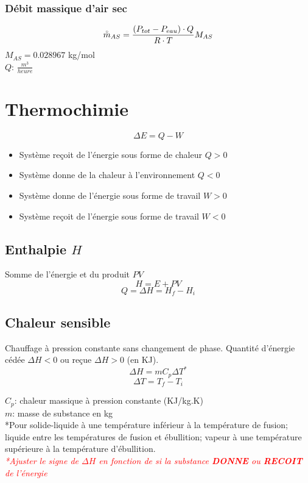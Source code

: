 \documentclass[twocolumn,letterpaper,8pt]{extarticle}
\newcommand{\warning}[1]{\textcolor{red}{\scriptsize\textit{#1}}}
\begin{document}
\subsubsection{Débit massique d'air sec}
$$\accentset{\circ}{m}_{AS}=\frac{(P_{tot}-P_{eau})\cdot Q}{R \cdot T}M_{AS}$$
{\footnotesize
$M_{AS}=0.028967$ kg/mol\\
$Q$: $\frac{m^3}{heure}$
}


\section{Thermochimie}
$$\Delta E = Q-W$$

\begin{itemize}
    \item Système reçoit de l'énergie sous forme de chaleur $Q>0$
    \item Système donne de la chaleur à l'environnement $Q<0$
    \item Système donne de l'énergie sous forme de travail $W>0$
    \item Système reçoit de l'énergie sous forme de travail $W<0$
\end{itemize}

\subsection{Enthalpie $H$}
Somme de l'énergie et du produit $PV$
$$H=E+PV$$
$$Q=\Delta H=H_f - H_i$$

\subsection{Chaleur sensible}
Chauffage à pression constante sans changement de phase. Quantité d'énergie cédée $\Delta H < 0$ ou reçue $\Delta H > 0$ (en KJ).
$$\Delta H=m C_p \Delta T^*$$
$$\Delta T = T_f - T_i$$
{\footnotesize
$C_p$: chaleur massique à pression constante (KJ/kg.K)\\
$m$: masse de substance en kg\\
*Pour solide-liquide à une température inférieur à la température de fusion; liquide entre les températures de fusion et ébullition; vapeur à une température supérieure à la température d'ébullition.\\
\warning{*Ajuster le signe de $\Delta H$ en fonction de si la substance \textbf{DONNE} ou \textbf{RECOIT} de l'énergie}

}
\end{document}
